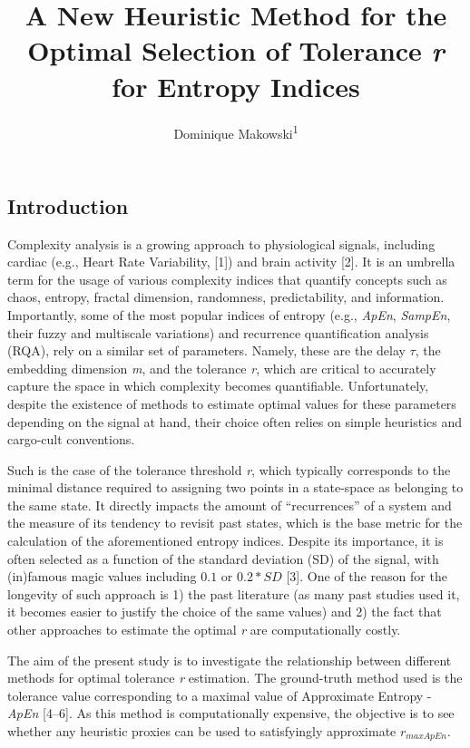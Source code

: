 \documentclass[
  man,floatsintext]{apa6}
\title{\textbf{A New Heuristic Method for the Optimal Selection of Tolerance \emph{r} for Entropy Indices}}
\author{Dominique Makowski\textsuperscript{1}}
\date{}
\affiliation{\vspace{0.5cm}\textsuperscript{1} School of Social Sciences, Nanyang Technological University, Singapore}
\begin{document}
\maketitle

\hypertarget{introduction}{%
\subsection{Introduction}\label{introduction}}

Complexity analysis is a growing approach to physiological signals, including cardiac (e.g., Heart Rate Variability, {[}1{]}) and brain activity {[}2{]}. It is an umbrella term for the usage of various complexity indices that quantify concepts such as chaos, entropy, fractal dimension, randomness, predictability, and information. Importantly, some of the most popular indices of entropy (e.g., \emph{ApEn}, \emph{SampEn}, their fuzzy and multiscale variations) and recurrence quantification analysis (RQA), rely on a similar set of parameters. Namely, these are the delay \(\tau\), the embedding dimension \emph{m}, and the tolerance \emph{r}, which are critical to accurately capture the space in which complexity becomes quantifiable. Unfortunately, despite the existence of methods to estimate optimal values for these parameters depending on the signal at hand, their choice often relies on simple heuristics and cargo-cult conventions.

Such is the case of the tolerance threshold \emph{r}, which typically corresponds to the minimal distance required to assigning two points in a state-space as belonging to the same state. It directly impacts the amount of ``recurrences'' of a system and the measure of its tendency to revisit past states, which is the base metric for the calculation of the aforementioned entropy indices. Despite its importance, it is often selected as a function of the standard deviation (SD) of the signal, with (in)famous magic values including \(0.1\) or \(0.2*SD\) {[}3{]}. One of the reason for the longevity of such approach is 1) the past literature (as many past studies used it, it becomes easier to justify the choice of the same values) and 2) the fact that other approaches to estimate the optimal \emph{r} are computationally costly.

The aim of the present study is to investigate the relationship between different methods for optimal tolerance \emph{r} estimation. The ground-truth method used is the tolerance value corresponding to a maximal value of Approximate Entropy - \emph{ApEn} {[}4--6{]}. As this method is computationally expensive, the objective is to see whether any heuristic proxies can be used to satisfyingly approximate \(r_{maxApEn}\).
\end{document}
